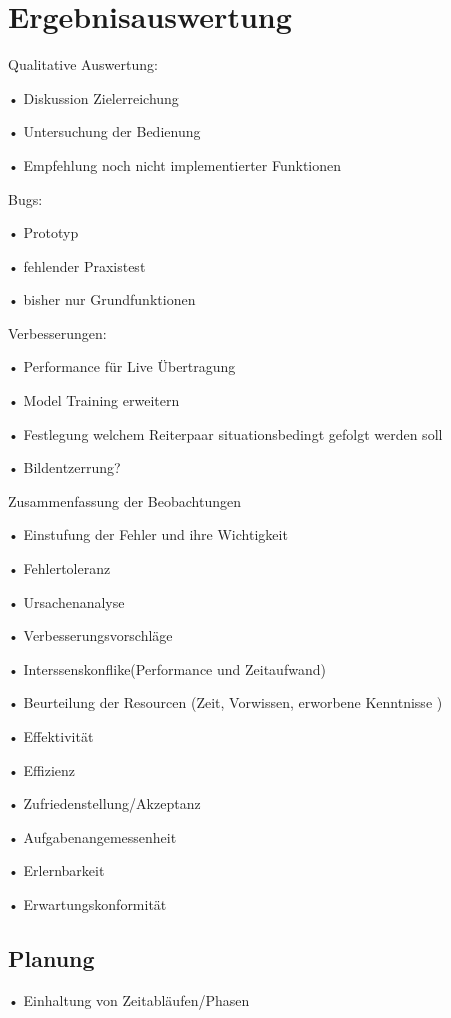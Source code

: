 \chapter{Ergebnisauswertung}
\label{ch:ergebnis}

Qualitative Auswertung:

•	Diskussion Zielerreichung

•	Untersuchung der Bedienung


•	Empfehlung noch nicht implementierter Funktionen

\vspace{1cm}

Bugs:

•	Prototyp

•	fehlender Praxistest

•	bisher nur Grundfunktionen

\vspace{1cm}

Verbesserungen:

•	Performance für Live Übertragung

•	Model Training erweitern

•	Festlegung welchem Reiterpaar situationsbedingt gefolgt werden soll

•	Bildentzerrung?


\vspace{1cm}
Zusammenfassung der Beobachtungen
	
	
•	Einstufung der Fehler und ihre Wichtigkeit

•	Fehlertoleranz

•	Ursachenanalyse
	
•	Verbesserungsvorschläge
	
•	Interssenskonflike(Performance und Zeitaufwand)
	
•	Beurteilung der Resourcen (Zeit, Vorwissen, erworbene Kenntnisse )

•	Effektivität

•	Effizienz

•	Zufriedenstellung/Akzeptanz

•	Aufgabenangemessenheit

•	Erlernbarkeit

•	Erwartungskonformität



\section{Planung}
•	Einhaltung von Zeitabläufen/Phasen

